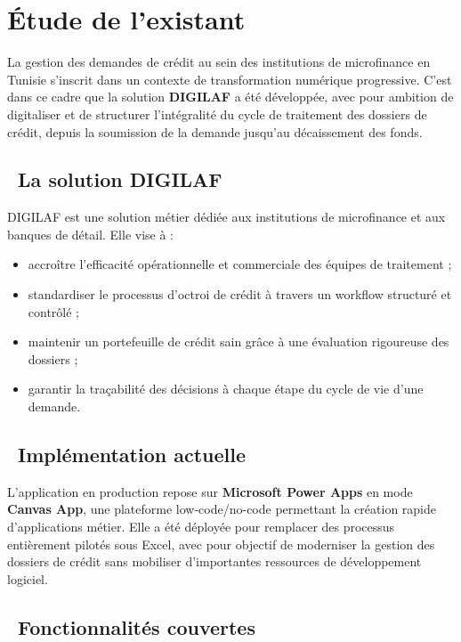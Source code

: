 \section{Étude de l'existant}

La gestion des demandes de crédit au sein des institutions de microfinance en Tunisie
s'inscrit dans un contexte de transformation numérique progressive. C'est dans ce cadre
que la solution \textbf{DIGILAF} a été développée, avec pour ambition de digitaliser et
de structurer l'intégralité du cycle de traitement des dossiers de crédit, depuis la
soumission de la demande jusqu'au décaissement des fonds.

\subsection*{~La solution DIGILAF}

DIGILAF est une solution métier dédiée aux institutions de microfinance et aux banques de
détail. Elle vise à :

\begin{itemize}
    \item accroître l'efficacité opérationnelle et commerciale des équipes de traitement ;
    \item standardiser le processus d'octroi de crédit à travers un workflow structuré et
    contrôlé ;
    \item maintenir un portefeuille de crédit sain grâce à une évaluation rigoureuse des
    dossiers ;
    \item garantir la traçabilité des décisions à chaque étape du cycle de vie d'une
    demande.
\end{itemize}

\subsection*{~Implémentation actuelle}

L'application en production repose sur \textbf{Microsoft Power Apps} en mode
\textbf{Canvas App}, une plateforme low-code/no-code permettant la création rapide
d'applications métier. Elle a été déployée pour remplacer des processus entièrement pilotés
sous Excel, avec pour objectif de moderniser la gestion des dossiers de crédit sans
mobiliser d'importantes ressources de développement logiciel.

\subsection*{~Fonctionnalités couvertes}

